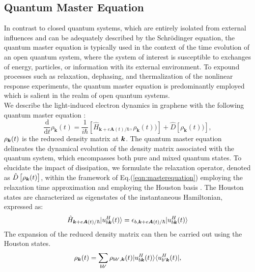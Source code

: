 \subsection{Quantum Master Equation \label{sec:master}}
In contrast to closed quantum systems, which are entirely isolated from external influences and can be adequately described by the Schrödinger equation, the quantum master equation is typically used in the context of the time evolution of an open quantum system, where the system of interest is susceptible to exchanges of energy, particles, or information with its external environment. 
To expound processes such as relaxation, dephasing, and thermalization of the nonlinear response experiments, the quantum master equation is predominantly employed which is salient in the realm of open quantum systems.\\
We describe the light-induced electron dynamics in graphene with the following quantum master equation \cite{sato2019light,sato2019microscopic,sato2021high,sato2021nonlinear}:
\begin{equation}
\frac{\mathrm{d}}{\mathrm{d}t}\rho_{\boldsymbol{k}}(t) = \frac{1}{i \hbar}	\left[ \hat{H}_{\boldsymbol{k}+e\boldsymbol{A}(t)/\hbar}, \rho_{\boldsymbol{k}} (t)) \right] + 	
\hat{D}\left[ \rho_{\boldsymbol{k}} (t)) \right],
\label{eqn:masterequation}
\end{equation}
$\rho_{\boldsymbol k}(t)$ is the reduced density matrix at $\boldsymbol k$. The quantum master equation delineates the dynamical evolution of the density matrix associated with the quantum system, which encompasses both pure and mixed quantum states. 
To elucidate the impact of dissipation, we formulate the relaxation operator, denoted as $\hat{D}\left[\rho_{\boldsymbol{k}} (t)\right]$, within the framework of Eq.(\ref{eqn:masterequation}) employing the relaxation time approximation\cite{meier1994coherent} and employing the Houston basis \cite{PhysRev.57.184, PhysRevB.33.5494}. The Houston states are characterized as eigenstates of the instantaneous Hamiltonian, expressed as:
\begin{align}
\hat{H}_{\boldsymbol{k}+e\boldsymbol{A}(t)/\hbar} |u^H_{b\boldsymbol k}(t)\rangle = \epsilon_{b,\boldsymbol k + e\boldsymbol A(t)/\hbar}|u^H_{b\boldsymbol k}(t)\rangle   
\label{eqn:Houston}
\end{align}
The expansion of the reduced density matrix can then be carried out using the Houston states.
\begin{align}
  \rho_{\boldsymbol k}(t) = \sum_{bb'}\rho_{bb',\boldsymbol k}(t)|u^H_{b\boldsymbol k}(t)\rangle \langle u^H_{b'\boldsymbol k}(t)|,
\end{align}
